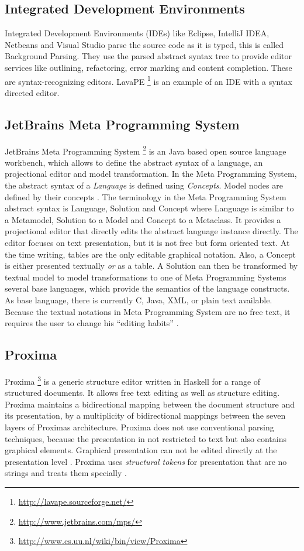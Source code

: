 \subsection{Integrated Development Environments}
Integrated Development Environments (IDEs) like Eclipse, IntelliJ IDEA, Netbeans and Visual Studio parse the source code as it is typed, this is called Background Parsing. They use the parsed abstract syntax tree to provide editor services like outlining, refactoring, error marking and content completion. These are syntax-recognizing editors. LavaPE \footnote{\raggedright \url{http://lavape.sourceforge.net/}} is an example of an IDE with a syntax directed editor.  

\subsection{JetBrains Meta Programming System}
JetBrains Meta Programming System \footnote{\raggedright \url{http://www.jetbrains.com/mps/}}  is an Java based open source language workbench, which allows to define the abstract syntax of a language, an projectional editor and model transformation. In the Meta Programming System, the abstract syntax of a \emph{Language} is defined using \emph{Concepts}. Model nodes are defined by their concepts \cite{MPStut}. The terminology in the Meta Programming System abstract syntax is Language, Solution and Concept where Language is similar to a Metamodel, Solution to a Model and Concept to a Metaclass. It provides a projectional editor that directly edits the abstract language instance directly. The editor focuses on text presentation, but it is not free but form oriented text. At the time writing, tables are the only editable graphical notation. Also, a Concept is either presented textually \emph{or} as a table. A Solution can then be transformed by textual model to model transformations to one of  Meta Programming Systems several base languages, which provide the semantics of the language constructs. As base language, there is currently C, Java, XML, or plain text available. Because the textual notations in Meta Programming System are no free text, it requires the user to change his ``editing habits'' \cite{VolterMPS}. 

\subsection{Proxima} 
Proxima \footnote{\raggedright \url{http://www.cs.uu.nl/wiki/bin/view/Proxima}}  is a generic structure editor written in Haskell for a range of structured documents. It allows free text editing as well as structure editing. Proxima maintains a bidirectional mapping between the document structure and its presentation, by a multiplicity of bidirectional mappings between the seven layers of Proximas architecture. Proxima does not use conventional parsing techniques, because the presentation in not restricted to text but also contains graphical elements. Graphical presentation can not be edited directly at the presentation level \cite{beyond_ascii}. Proxima uses \emph{structural tokens} for presentation that are no strings and treats them specially \cite{proxima}.

